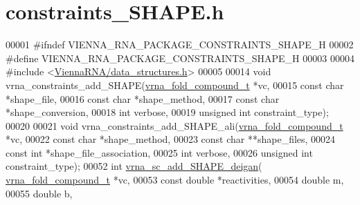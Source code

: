 \hypertarget{constraints__SHAPE_8h_source}{}\section{constraints\+\_\+\+S\+H\+A\+P\+E.\+h}
\label{constraints__SHAPE_8h_source}

\begin{DoxyCode}
00001 \textcolor{preprocessor}{#ifndef VIENNA\_RNA\_PACKAGE\_CONSTRAINTS\_SHAPE\_H}
00002 \textcolor{preprocessor}{#define VIENNA\_RNA\_PACKAGE\_CONSTRAINTS\_SHAPE\_H}
00003 
00004 \textcolor{preprocessor}{#include <\hyperlink{data__structures_8h}{ViennaRNA/data\_structures.h}>}
00005 
00014 \textcolor{keywordtype}{void} vrna\_constraints\_add\_SHAPE(\hyperlink{group__fold__compound_structvrna__fc__s}{vrna\_fold\_compound\_t} *vc,
00015                                 \textcolor{keyword}{const} \textcolor{keywordtype}{char} *shape\_file,
00016                                 \textcolor{keyword}{const} \textcolor{keywordtype}{char} *shape\_method,
00017                                 \textcolor{keyword}{const} \textcolor{keywordtype}{char} *shape\_conversion,
00018                                 \textcolor{keywordtype}{int} verbose,
00019                                 \textcolor{keywordtype}{unsigned} \textcolor{keywordtype}{int} constraint\_type);
00020 
00021 \textcolor{keywordtype}{void} vrna\_constraints\_add\_SHAPE\_ali(\hyperlink{group__fold__compound_structvrna__fc__s}{vrna\_fold\_compound\_t} *vc,
00022                                     \textcolor{keyword}{const} \textcolor{keywordtype}{char} *shape\_method,
00023                                     \textcolor{keyword}{const} \textcolor{keywordtype}{char} **shape\_files,
00024                                     \textcolor{keyword}{const} \textcolor{keywordtype}{int}  *shape\_file\_association,
00025                                     \textcolor{keywordtype}{int} verbose,
00026                                     \textcolor{keywordtype}{unsigned} \textcolor{keywordtype}{int} constraint\_type);
00052 \textcolor{keywordtype}{int} \hyperlink{group__SHAPE__reactivities_ga57d612b58e1c61dd6cfcb5a843f8f1b3}{vrna\_sc\_add\_SHAPE\_deigan}( \hyperlink{group__fold__compound_structvrna__fc__s}{vrna\_fold\_compound\_t} *vc,
00053                               \textcolor{keyword}{const} \textcolor{keywordtype}{double} *reactivities,
00054                               \textcolor{keywordtype}{double} m,
00055                               \textcolor{keywordtype}{double} b,

\end{DoxyCode}
